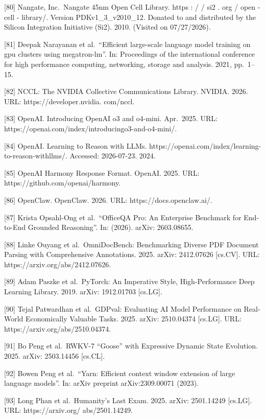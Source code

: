 \documentclass[
  10
]{article}
\begin{document}
{[}80{]} Nangate, Inc.~Nangate 45nm Open Cell Library. https : / / si2 .
org / open - cell - library/. Version PDKv1\_3\_v2010\_12. Donated to
and distributed by the Silicon Integration Initiative (Si2). 2010.
(Visited on 07/27/2026).

{[}81{]} Deepak Narayanan et al.~``Efficient large-scale language model
training on gpu clusters using megatron-lm''. In: Proceedings of the
international conference for high performance computing, networking,
storage and analysis. 2021, pp.~1--15.

{[}82{]} NCCL: The NVIDIA Collective Communications Library. NVIDIA.
2026. URL: https://developer.nvidia. com/nccl.

{[}83{]} OpenAI. Introducing OpenAI o3 and o4-mini. Apr.~2025. URL:
https://openai.com/index/introducingo3-and-o4-mini/.

{[}84{]} OpenAI. Learning to Reason with LLMs.
https://openai.com/index/learning-to-reason-withllms/. Accessed:
2026-07-23. 2024.

{[}85{]} OpenAI Harmony Response Format. OpenAI. 2025. URL:
https://github.com/openai/harmony.

{[}86{]} OpenClaw. OpenClaw. 2026. URL: https://docs.openclaw.ai/.

{[}87{]} Krista Opsahl-Ong et al.~``OfficeQA Pro: An Enterprise
Benchmark for End-to-End Grounded Reasoning''. In: (2026). arXiv:
2603.08655.

{[}88{]} Linke Ouyang et al.~OmniDocBench: Benchmarking Diverse PDF
Document Parsing with Comprehensive Annotations. 2025. arXiv: 2412.07626
{[}cs.CV{]}. URL: https://arxiv.org/abs/2412.07626.

{[}89{]} Adam Paszke et al.~PyTorch: An Imperative Style,
High-Performance Deep Learning Library. 2019. arXiv: 1912.01703
{[}cs.LG{]}.

{[}90{]} Tejal Patwardhan et al.~GDPval: Evaluating AI Model Performance
on Real-World Economically Valuable Tasks. 2025. arXiv: 2510.04374
{[}cs.LG{]}. URL: https://arxiv.org/abs/2510.04374.

{[}91{]} Bo Peng et al.~RWKV-7 ``Goose'' with Expressive Dynamic State
Evolution. 2025. arXiv: 2503.14456 {[}cs.CL{]}.

{[}92{]} Bowen Peng et al.~``Yarn: Efficient context window extension of
large language models''. In: arXiv preprint arXiv:2309.00071 (2023).

{[}93{]} Long Phan et al.~Humanity's Last Exam. 2025. arXiv: 2501.14249
{[}cs.LG{]}. URL: https://arxiv.org/ abs/2501.14249.
\end{document}
